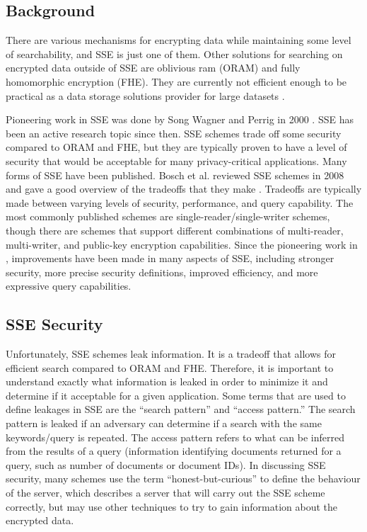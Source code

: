 \documentclass{sig-alternate-05-2015}
\begin{document}
\subsection{Background}
There are various mechanisms for encrypting data while maintaining some level of searchability, and SSE is just one of them. Other solutions for searching on encrypted data outside of SSE are oblivious ram (ORAM) and fully homomorphic encryption (FHE). They are currently not efficient enough to be practical as a data storage solutions provider for large datasets \cite{davidcashetal.2014}.

Pioneering work in SSE was done by Song Wagner and Perrig in 2000 \cite{swp.2000}. SSE has been an active research topic since then. SSE schemes trade off some security compared to ORAM and FHE, but they are typically proven to have a level of security that would be acceptable for many privacy-critical applications. Many forms of SSE have been published. Bosch et al. reviewed SSE schemes in 2008 and gave a good overview of the tradeoffs that they make \cite{bosch.2014}. Tradeoffs are typically made between varying levels of security, performance, and query capability. The most commonly published schemes are single-reader/single-writer schemes, though there are schemes that support different combinations of multi-reader, multi-writer, and public-key encryption capabilities. Since the pioneering work in \cite{swp.2000}, improvements have been made in many aspects of SSE, including stronger security, more precise security definitions, improved efficiency, and more expressive query capabilities.

\subsection{SSE Security}
Unfortunately, SSE schemes leak information. It is a tradeoff that allows for efficient search compared to ORAM and FHE. Therefore, it is important to understand exactly what information is leaked in order to minimize it and determine if it acceptable for a given application. Some terms that are used to define leakages in SSE are the ``search pattern'' and ``access pattern.''\cite{bosch.2014} The search pattern is leaked if an adversary can determine if a search with the same keywords/query is repeated. The access pattern refers to what can be inferred from the results of a query (information identifying documents returned for a query, such as number of documents or document IDs). In discussing SSE security, many schemes use the term ``honest-but-curious'' to define the behaviour of the server, which describes a server that will carry out the SSE scheme correctly, but may use other techniques to try to gain information about the encrypted data.
\end{document}
